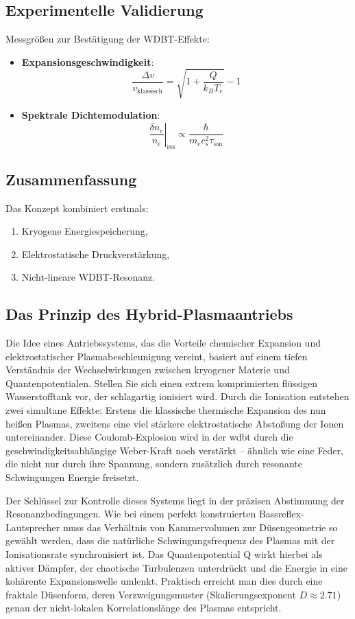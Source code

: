 \subsection{Experimentelle Validierung}
\label{subsec:experiment}

Messgrößen zur Bestätigung der WDBT-Effekte:

\begin{itemize}
\item \textbf{Expansionsgeschwindigkeit}:
\[
\frac{\Delta v}{v_{\text{klassisch}}} = \sqrt{1 + \frac{Q}{k_B T_e}} - 1
\]

\item \textbf{Spektrale Dichtemodulation}:
\[
\left.\frac{\delta n_e}{n_e}\right|_{\text{res}} \propto \frac{\hbar}{m_e c_s^2 \tau_{\text{ion}}}
\]
\end{itemize}

\subsection*{Zusammenfassung}
Das Konzept kombiniert erstmals:
\begin{enumerate}
\item Kryogene Energiespeicherung,
\item Elektrostatische Druckverstärkung,
\item Nicht-lineare WDBT-Resonanz.
\end{enumerate}

\subsection{Das Prinzip des Hybrid-Plasmaantriebs}
Die Idee eines Antriebssystems, das die Vorteile chemischer Expansion und elektrostatischer Plasmabeschleunigung vereint, basiert auf einem tiefen Verständnis der Wechselwirkungen zwischen kryogener
Materie und Quantenpotentialen. Stellen Sie sich einen extrem komprimierten flüssigen Wasserstofftank vor, der schlagartig ionisiert wird. Durch die Ionisation entstehen zwei simultane Effekte: Erstens
die klassische thermische Expansion des nun heißen Plasmas, zweitens eine viel stärkere elektrostatische Abstoßung der Ionen untereinander. Diese Coulomb-Explosion wird in der \gls{wdbt} durch die
geschwindigkeitsabhängige Weber-Kraft noch verstärkt – ähnlich wie eine Feder, die nicht nur durch ihre Spannung, sondern zusätzlich durch resonante Schwingungen Energie freisetzt.

Der Schlüssel zur Kontrolle dieses Systems liegt in der präzisen Abstimmung der Resonanzbedingungen. Wie bei einem perfekt konstruierten Bassreflex-Lautsprecher muss das Verhältnis von Kammervolumen
zur Düsengeometrie so gewählt werden, dass die natürliche Schwingungsfrequenz des Plasmas mit der Ionisationsrate synchronisiert ist. Das Quantenpotential Q wirkt hierbei als aktiver Dämpfer, der
chaotische Turbulenzen unterdrückt und die Energie in eine kohärente Expansionswelle umlenkt. Praktisch erreicht man dies durch eine fraktale Düsenform, deren Verzweigungsmuster
(Skalierungsexponent $D \approx 2.71$) genau der nicht-lokalen Korrelationslänge des Plasmas entspricht.

